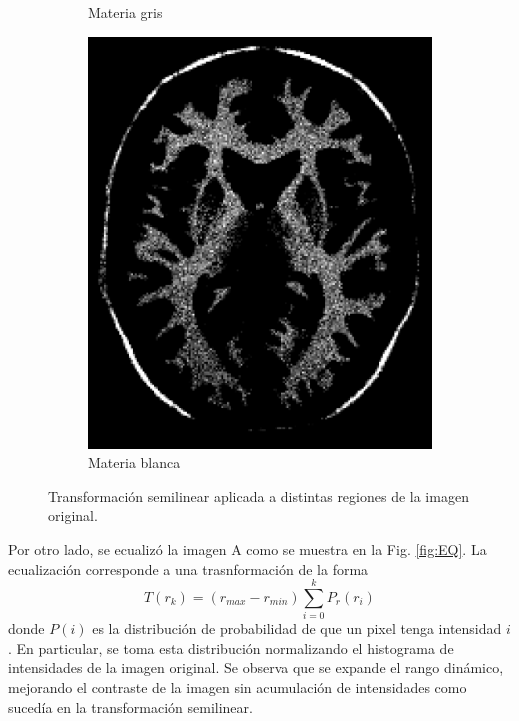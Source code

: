 \documentclass[letterpaper,12pt]{article}
\theoremstyle{plain}
\begin{document}
\begin{figure}[h]
\begin{subfigure}[h]{0.24\linewidth}
            \caption{Materia gris} 
         \end{subfigure}
         \begin{subfigure}[h]{0.24\linewidth}
            \centering
            \includegraphics[width=\textwidth]{Figuras/ImageA_113_150.png}
            \caption{Materia blanca} 
         \end{subfigure}
    \caption{Transformación semilinear aplicada a distintas regiones de la imagen original.%
    }
    \label{fig:Semilineartrans_region}
\end{figure}

Por otro lado, se ecualizó la imagen A como se muestra en la Fig. \ref{fig:EQ}. La ecualización corresponde a una trasnformación de la forma
\begin{equation}
    T(r_k) = (r_{max} - r_{min}) \sum_{i=0}^{k} P_r(r_i)
\end{equation}
donde $P(i)$ es la distribución de probabilidad de que un pixel tenga intensidad $i$. En particular, se toma esta distribución normalizando el histograma de intensidades de la imagen original. Se observa que se expande el rango dinámico, mejorando el contraste de la imagen sin acumulación de intensidades como sucedía en la transformación semilinear.
\end{document}
